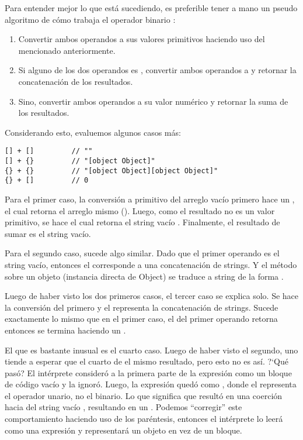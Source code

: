 Para entender mejor lo que está sucediendo, es preferible tener a mano un pseudo algoritmo de cómo trabaja el operador binario \code{+}:

\begin{enumerate}
\item Convertir ambos operandos a sus valores primitivos haciendo uso del  mencionado anteriormente.
\item Si alguno de los dos operandos es , convertir ambos operandos a  y retornar la concatenación de los resultados.
\item Sino, convertir ambos operandos a su valor numérico y retornar la suma de los resultados.
\end{enumerate}

Considerando esto, evaluemos algunos casos más:

\begin{lstlisting}[title={Operador \code{+} con arreglos y objetos}]
[] + []			// ""
[] + {}			// "[object Object]"
{} + {}			// "[object Object][object Object]"
{} + []			// 0
\end{lstlisting}

Para el primer caso, la conversión a primitivo del arreglo vacío \code{[]} primero hace un , el cual retorna el arreglo mismo (). Luego, como el resultado no es un valor primitivo, se hace  el cual retorna el string vacío . Finalmente, el resultado de sumar \code{[] + []} es el string vacío.

Para el segundo caso, sucede algo similar. Dado que el primer operando es el string vacío, entonces el \code{+} corresponde a una concatenación de strings. Y el método  sobre un objeto (instancia directa de Object) se traduce a string de la forma .

Luego de haber visto los dos primeros casos, el tercer caso se explica solo. Se hace la conversión del primero y el \code{+} representa la concatenación de strings. Sucede exactamente lo mismo que en el primer caso, el  del primer operando retorna  entonces se termina haciendo un .

El que es bastante inusual es el cuarto caso. Luego de haber visto el segundo, uno tiende a esperar que el cuarto de el mismo resultado, pero esto no es así. ?`Qué pasó? El intérprete consideró a la primera parte de la expresión como un bloque de código vacío y la ignoró. Luego, la expresión quedó como \code{+[]}, donde el \code{+} representa el operador unario, no el binario. Lo que significa que resultó en una coerción hacia  del string vacío , resultando en un . Podemos "`corregir"' este comportamiento haciendo uso de los paréntesis, entonces el intérprete lo leerá como una expresión y \code{\{\}} representará un objeto en vez de un bloque.

